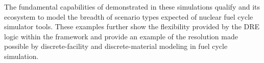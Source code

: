 The fundamental capabilities of demonstrated in these simulations qualify
\Cyclus and its ecosystem to model the breadth of scenario types expected of
nuclear fuel cycle simulator tools. These examples further show the flexibility
provided by the \gls{DRE} logic within the \Cyclus framework and provide
an example of the resolution made possible by discrete-facility and
discrete-material modeling in fuel cycle simulation.
